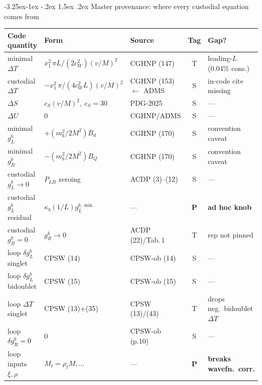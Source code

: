 \documentclass[11pt]{article}
\makeatletter
\renewcommand\subsection{\@startsection{subsection}{2}{\z@}%
  {-3.25ex\@plus -1ex \@minus -.2ex}%
  {1.5ex \@plus .2ex}%
  {\normalfont\large\bfseries\color{accent}}}
\makeatother
\begin{document}
\subsection{Master provenance: where every custodial equation comes from}

\begin{center}
\footnotesize
\renewcommand{\arraystretch}{1.25}
\setlength{\tabcolsep}{4pt}
\begin{tabular}{@{}>{\raggedright\arraybackslash}p{}>{\raggedright\arraybackslash}p{}>{\raggedright\arraybackslash}p{}c>{\raggedright\arraybackslash}p{}@{}}
\toprule
\textbf{Code quantity} & \textbf{Form} & \textbf{Source} & \textbf{Tag} & \textbf{Gap?} \\
\midrule
minimal $\Delta T$ & $x_1^2\,\pi L/(2c_W^2)(v/M)^2$ & CGHNP (147) & T & leading-$L$ (0.04\% cons.) \\
custodial $\Delta T$ & $-x_1^2\,\pi/(4c_W^2 L)(v/M)^2$ & CGHNP (153) $\leftarrow$ ADMS & S & in-code cite missing \\
$\Delta S$ & $c_S(v/M)^2,\ c_S{=}30$ & PDG-2025 & S & --- \\
$\Delta U$ & $0$ & CGHNP/ADMS & S & --- \\
minimal $g_L^b$ & $+(m_b^2/2M^2)B_d$ & CGHNP (170) & S & convention caveat \\
minimal $g_R^b$ & $-(m_b^2/2M^2)B_Q$ & CGHNP (170) & S & convention caveat \\
custodial $g_L^b\to0$ & $P_{LR}$ zeroing & ACDP (3)--(12) & S & --- \\
custodial $g_L^b$ residual & $\kappa_b(1/L)g_L^{b,\min}$ & --- & \textbf{P} & \textbf{ad hoc knob} \\
custodial $g_R^b{=}0$ & $g_R^b\to0$ & ACDP (22)/Tab.\,1 & T & rep not pinned \\
loop $\delta g_L^b$ singlet & CPSW (14) & CPSW-ob (14) & S & --- \\
loop $\delta g_L^b$ bidoublet & CPSW (15) & CPSW-ob (15) & S & --- \\
loop $\Delta T$ singlet & CPSW (13)+(35) & CPSW (13)/(43) & T & drops neg.\ bidoublet $\Delta T$ \\
loop $\delta g_R^b{=}0$ & $0$ & CPSW-ob (p.10) & S & --- \\
loop inputs $\xi,\rho$ & $M_t{=}\rho_t M,\dots$ & --- & \textbf{P} & \textbf{breaks wavefn.\ corr.} \\
\bottomrule
\end{tabular}
\end{center}
\end{document}
